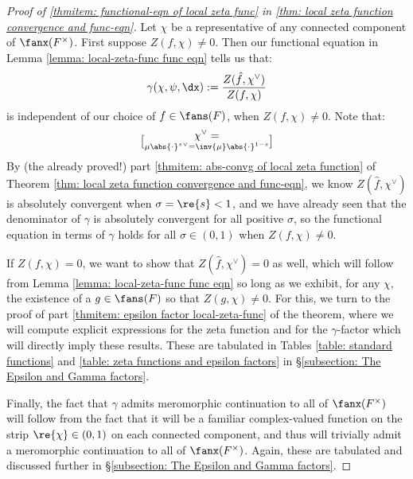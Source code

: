 \documentclass[11pt, x11names, openany]{book}
\begin{document}
\begin{proof}[Proof of \ref{thmitem: functional-eqn of local zeta func} in \ref{thm: local zeta function convergence and func-eqn}]
Let $\chi$ be a representative of any connected component of $\fanx(F^\times)$. First suppose $Z(f, \chi) \neq 0$. Then our functional equation in Lemma \ref{lemma: local-zeta-func func eqn} tells us that:
\begin{equation*}
    \gamma(\chi, \psi, \dx) := \frac{Z(\hat{f}, \chi^\lor)}{Z(f, \chi)}
\end{equation*}
is independent of our choice of $f \in \fans(F)$, when $Z(f, \chi) \neq 0$. Note that:
\begin{equation*}
    \chi^\lor = \brack{\mu \abs{\cdot}^s}^\lor = \inv{\mu} \abs{\cdot}^{1-s}
\end{equation*}
By (the already proved!) part \ref{thmitem: abs-convg of local zeta function} of Theorem \ref{thm: local zeta function convergence and func-eqn}, we know $Z(\hat{f}, \chi^\lor)$ is absolutely convergent when $\sigma = \re{s} < 1$, and we have already seen that the denominator of $\gamma$ is absolutely convergent for all positive $\sigma$, so the functional equation in terms of $\gamma$ holds for all $\sigma \in (0, 1)$ when $Z(f, \chi) \neq 0$.

If $Z(f, \chi) = 0$, we want to show that $Z(\hat{f}, \chi^\lor) = 0$ as well, which will follow from Lemma \ref{lemma: local-zeta-func func eqn} so long as we exhibit, for any $\chi$, the existence of a $g \in \fans(F)$ so that $Z(g, \chi) \neq 0$. For this, we turn to the proof of part \ref{thmitem: epsilon factor local-zeta-func} of the theorem, where we will compute explicit expressions for the zeta function and for the $\gamma$-factor which will directly imply these results. These are tabulated in Tables \ref{table: standard functions} and \ref{table: zeta functions and epsilon factors} in \S \ref{subsection: The Epsilon and Gamma factors}.

Finally, the fact that $\gamma$ admits meromorphic continuation to all of $\fanx(F^\times)$ will follow from the fact that it will be a familiar complex-valued function on the strip $\re{\chi} \in (0, 1)$ on each connected component, and thus will trivially admit a meromorphic continuation to all of $\fanx(F^\times)$. Again, these are tabulated and discussed further in \S \ref{subsection: The Epsilon and Gamma factors}.
\end{proof}
\end{document}
